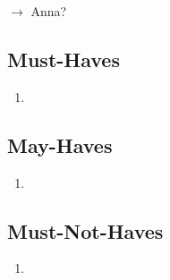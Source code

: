 $\rightarrow$ Anna?

\subsection{Must-Haves}
\begin{enumerate}
	\item 
\end{enumerate}
\subsection{May-Haves}
\begin{enumerate}
	\item 
\end{enumerate}
\subsection{Must-Not-Haves}
\begin{enumerate}
	\item 
\end{enumerate}